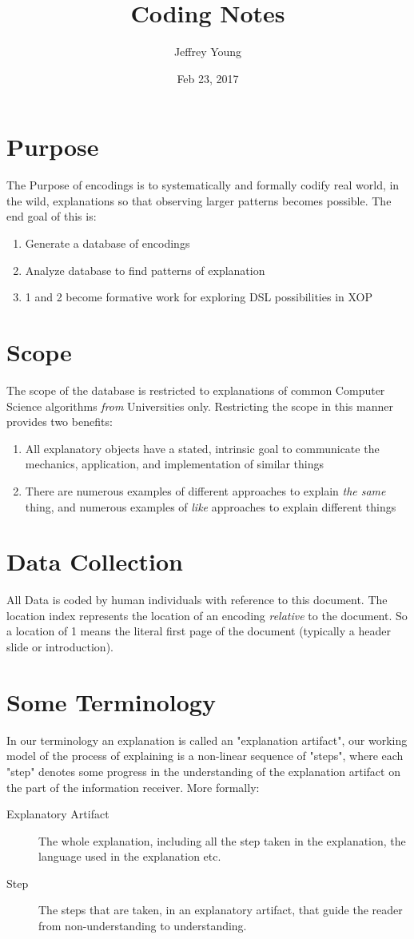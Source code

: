 \documentclass[10pt, letterpaper]{article}
\author{Jeffrey Young}
\date{Feb 23, 2017}
\title{Coding Notes}
\begin{document}
\maketitle

\section*{Purpose}
\label{sec:org1d21623}
The Purpose of encodings is to systematically and formally codify real world, in the wild, explanations so that observing larger patterns becomes possible. The end goal of this is:
\begin{enumerate}
\item Generate a database of encodings
\item Analyze database to find patterns of explanation
\item 1 and 2 become formative work for exploring DSL possibilities in XOP
\end{enumerate}
\section*{Scope}
\label{sec:orgab8b870}
The scope of the database is restricted to explanations of common Computer Science algorithms \emph{from} Universities only. Restricting the scope in this manner provides two benefits:
\begin{enumerate}
\item All explanatory objects have a stated, intrinsic goal to communicate the mechanics, application, and implementation of similar things
\item There are numerous examples of different approaches to explain \emph{the same} thing, and numerous examples of \emph{like} approaches to explain different things
\end{enumerate}

\section*{Data Collection}
\label{sec:org0657620}
All Data is coded by human individuals with reference to this document. The location index represents the location of an encoding \emph{relative} to the document. So a location of 1 means the literal first page of the document (typically a header slide or introduction).
\section*{Some Terminology}
\label{sec:org1299bbd}
In our terminology an explanation is called an "explanation artifact", our
  working model of the process of explaining is a non-linear sequence of
  "steps", where each "step" denotes some progress in the understanding of the
  explanation artifact on the part of the information receiver. More formally:
\begin{description}
\item[{Explanatory Artifact}] The whole explanation, including all the step taken in the explanation, the language used in the explanation etc.
\item[{Step}] The steps that are taken, in an explanatory artifact, that guide the
reader from non-understanding to understanding.
\end{description}
\end{document}
